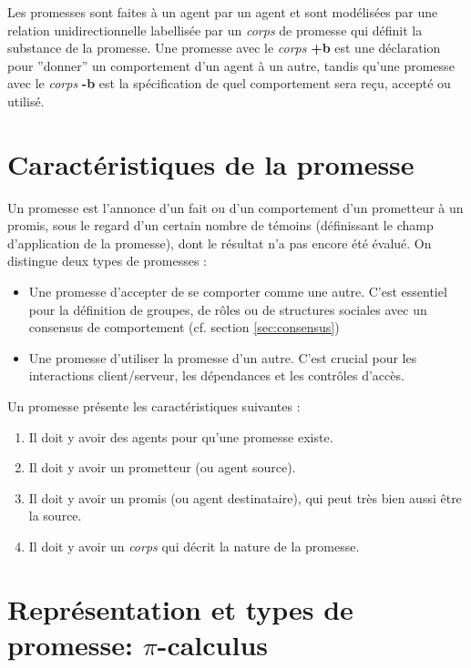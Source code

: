 Les promesses sont faites à un agent par un agent et sont modélisées par une
relation unidirectionnelle labellisée par un \emph{corps} de promesse qui
définit la substance de la promesse. Une promesse avec le \emph{corps}
\textbf{+b} est une déclaration pour ''donner'' un comportement d'un agent à un
autre, tandis qu'une promesse avec le \emph{corps} \textbf{-b} est la
spécification de quel comportement sera reçu, accepté ou utilisé.

\section{Caractéristiques de la promesse}

Un promesse est l'annonce d'un fait ou d'un comportement d'un prometteur à un
promis, sous le regard d'un certain nombre de témoins (définissant le champ
d'application de la promesse), dont le résultat n'a pas encore été évalué.  On
distingue deux types de promesses :

\begin{itemize}
    \item Une promesse d'accepter de se comporter comme une autre. C'est
        essentiel pour la définition de groupes, de rôles ou de structures
        sociales avec un consensus de comportement (cf. section
        \ref{sec:consensus})
    \item Une promesse d'utiliser la promesse d'un autre. C'est crucial pour les
        interactions client/serveur, les dépendances et les contrôles d'accès.
\end{itemize}

Un promesse présente les caractéristiques suivantes :

\begin{enumerate}
    \item Il doit y avoir des agents pour qu'une promesse existe.
    \item Il doit y avoir un prometteur (ou agent source).
    \item Il doit y avoir un promis (ou agent destinataire), qui peut très bien
        aussi être la source.
    \item Il doit y avoir un \emph{corps} qui décrit la nature de la promesse.
\end{enumerate}

\section{Représentation et types de promesse: $\pi$-calculus}

